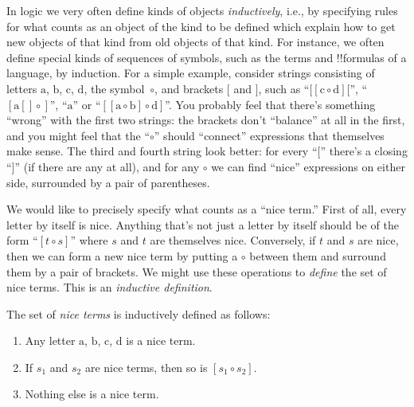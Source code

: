 \documentclass[../../../include/open-logic-section]{subfiles}
\begin{document}


In logic we very often define kinds of objects \emph{inductively},
i.e., by specifying rules for what counts as an object of the kind to
be defined which explain how to get new objects of that kind from old
objects of that kind.  For instance, we often define special kinds of
sequences of symbols, such as the terms and !!{formula}s of a
language, by induction.  For a simple example, consider strings
consisting of letters $\mathrm{a}$, $\mathrm{b}$, $\mathrm{c}$,
$\mathrm{d}$, the symbol~$\circ$, and brackets $[$ and $]$, such as
``$[[\mathrm{c} \circ \mathrm{d}][$'', ``$[\mathrm{a}[]\circ]$'',
``$\mathrm{a}$'' or ``$[[\mathrm{a} \circ \mathrm{b}]\circ
\mathrm{d}]$''.  You probably feel that there's something
``wrong'' with the first two strings: the brackets don't
``balance'' at all in the first, and you might feel that the
``$\circ$'' should ``connect'' expressions that themselves make
sense. The third and fourth string look better: for every ``$[$''
there's a closing ``$]$'' (if there are any at all), and for any
$\circ$ we can find ``nice'' expressions on either side,
surrounded by a pair of parentheses.

We would like to precisely specify what counts as a ``nice term.''
First of all, every letter by itself is nice.  Anything that's not
just a letter by itself should be of the form ``$[t \circ s]$'' where
$s$ and $t$ are themselves nice. Conversely, if $t$ and $s$ are nice,
then we can form a new nice term by putting a $\circ$ between them and
surround them by a pair of brackets.  We might use these operations
to \emph{define} the set of nice terms.  This is an \emph{inductive
  definition}.

\begin{defn}
  The set of \emph{nice terms} is inductively defined as follows:
  \begin{enumerate}
  \item Any letter $\mathrm{a}$, $\mathrm{b}$, $\mathrm{c}$,
    $\mathrm{d}$ is a nice term.
  \item If $s_1$ and $s_2$ are nice terms, then so
    is $[s_1 \circ s_2]$.
  \item Nothing else is a nice term.
  \end{enumerate}
\end{defn}
\end{document}
